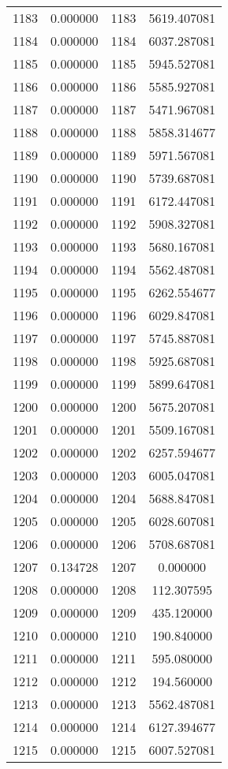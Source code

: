 \documentclass[12pt]{article}
\begin{document}
\begin{longtable}{@{}cccc@{}}
1183 & 0.000000 & 1183 & 5619.407081 \\
1184 & 0.000000 & 1184 & 6037.287081 \\
1185 & 0.000000 & 1185 & 5945.527081 \\
1186 & 0.000000 & 1186 & 5585.927081 \\
1187 & 0.000000 & 1187 & 5471.967081 \\
1188 & 0.000000 & 1188 & 5858.314677 \\
1189 & 0.000000 & 1189 & 5971.567081 \\
1190 & 0.000000 & 1190 & 5739.687081 \\
1191 & 0.000000 & 1191 & 6172.447081 \\
1192 & 0.000000 & 1192 & 5908.327081 \\
1193 & 0.000000 & 1193 & 5680.167081 \\
1194 & 0.000000 & 1194 & 5562.487081 \\
1195 & 0.000000 & 1195 & 6262.554677 \\
1196 & 0.000000 & 1196 & 6029.847081 \\
1197 & 0.000000 & 1197 & 5745.887081 \\
1198 & 0.000000 & 1198 & 5925.687081 \\
1199 & 0.000000 & 1199 & 5899.647081 \\
1200 & 0.000000 & 1200 & 5675.207081 \\
1201 & 0.000000 & 1201 & 5509.167081 \\
1202 & 0.000000 & 1202 & 6257.594677 \\
1203 & 0.000000 & 1203 & 6005.047081 \\
1204 & 0.000000 & 1204 & 5688.847081 \\
1205 & 0.000000 & 1205 & 6028.607081 \\
1206 & 0.000000 & 1206 & 5708.687081 \\
1207 & 0.134728 & 1207 & 0.000000 \\
1208 & 0.000000 & 1208 & 112.307595 \\
1209 & 0.000000 & 1209 & 435.120000 \\
1210 & 0.000000 & 1210 & 190.840000 \\
1211 & 0.000000 & 1211 & 595.080000 \\
1212 & 0.000000 & 1212 & 194.560000 \\
1213 & 0.000000 & 1213 & 5562.487081 \\
1214 & 0.000000 & 1214 & 6127.394677 \\
1215 & 0.000000 & 1215 & 6007.527081 \\

\end{longtable}
\end{document}
